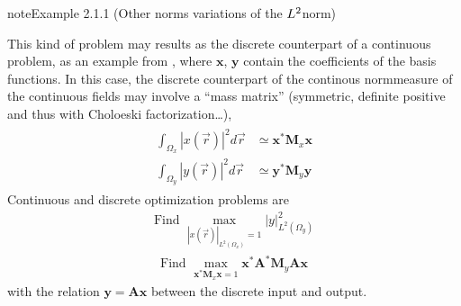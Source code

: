 \documentclass[letterpaper,10pt,english]{jupyterBook}
\begin{document}
\begin{sphinxadmonition}{note}{Example 2.1.1 (Other norms \sphinxhyphen{} variations of the \protect\(L^2\protect\)\sphinxhyphen{}norm)}



\sphinxAtStartPar
This kind of problem may results as the discrete counterpart of a continuous problem, as an example from {\hyperref[\detokenize{ch/pde/fem:pde-fem}]{}}, where \(\mathbf{x}\), \(\mathbf{y}\) contain the coefficients of the basis functions. In this case, the discrete counterpart of the continous norm\sphinxhyphen{}measure of the continuous fields may involve a “mass matrix” (symmetric, definite positive \sphinxhyphen{} and thus with Choloeski factorization…),
\begin{equation*}
\begin{split}\begin{aligned}
  \int_{\Omega_x} |x(\vec{r})|^2 d \vec{r} & \simeq \mathbf{x}^* \mathbf{M}_x \mathbf{x} \\
  \int_{\Omega_y} |y(\vec{r})|^2 d \vec{r} & \simeq \mathbf{y}^* \mathbf{M}_y \mathbf{y}
\end{aligned}\end{split}
\end{equation*}
\sphinxAtStartPar
Continuous and discrete optimization problems are
\begin{equation*}
\begin{split}\text{Find } \max_{|x(\vec{r})|_{L^2(\Omega_x)}=1} |y|^2_{L^2(\Omega_y)} \end{split}
\end{equation*}\begin{equation*}
\begin{split}\text{Find } \max_{\mathbf{x}^*\mathbf{M}_x  \mathbf{x}=1} \mathbf{x}^* \mathbf{A}^* \mathbf{M}_y \mathbf{A} \mathbf{x} \end{split}
\end{equation*}
\sphinxAtStartPar
with the relation \(\mathbf{y} = \mathbf{A} \mathbf{x}\) between the discrete input and output.


\end{sphinxadmonition}
\end{document}
